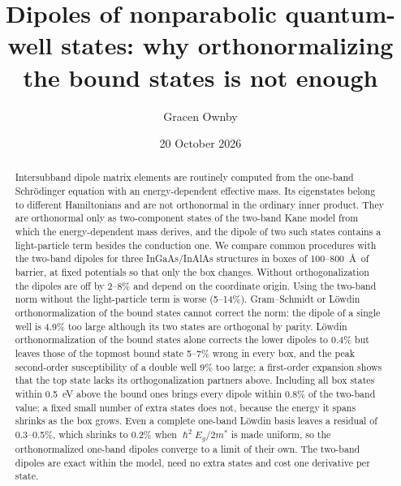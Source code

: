 \documentclass[11pt]{article}
\title{Dipoles of nonparabolic quantum-well states: why orthonormalizing the bound states is not enough}
\author{Gracen Ownby}
\affil{University of Oklahoma, Norman, Oklahoma, USA}
\date{\small 20 October 2026}
\begin{document}
\maketitle

\begin{abstract}
Intersubband dipole matrix elements are routinely computed from the one-band Schr\"odinger equation with an energy-dependent effective mass. Its eigenstates belong to different Hamiltonians and are not orthonormal in the ordinary inner product. They are orthonormal only as two-component states of the two-band Kane model from which the energy-dependent mass derives, and the dipole of two such states contains a light-particle term besides the conduction one. We compare common procedures with the two-band dipoles for three InGaAs/InAlAs structures in boxes of 100--800~\AA\ of barrier, at fixed potentials so that only the box changes. Without orthogonalization the dipoles are off by 2--8\% and depend on the coordinate origin. Using the two-band norm without the light-particle term is worse (5--14\%). Gram--Schmidt or L\"owdin orthonormalization of the bound states cannot correct the norm: the dipole of a single well is 4.9\% too large although its two states are orthogonal by parity. L\"owdin orthonormalization of the bound states alone corrects the lower dipoles to 0.4\% but leaves those of the topmost bound state 5--7\% wrong in every box, and the peak second-order susceptibility of a double well 9\% too large; a first-order expansion shows that the top state lacks its orthogonalization partners above. Including all box states within 0.5~eV above the bound ones brings every dipole within 0.8\% of the two-band value; a fixed small number of extra states does not, because the energy it spans shrinks as the box grows. Even a complete one-band L\"owdin basis leaves a residual of 0.3--0.5\%, which shrinks to 0.2\% when $\hslash^2E_g/2m^*$ is made uniform, so the orthonormalized one-band dipoles converge to a limit of their own. The two-band dipoles are exact within the model, need no extra states and cost one derivative per state.
\end{abstract}
\end{document}
